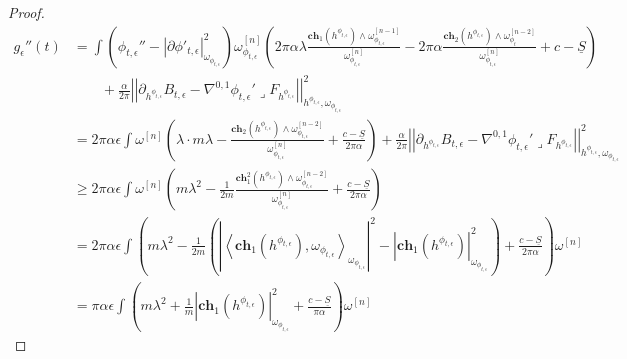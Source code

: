 \documentclass[10pt, letterpaper]{amsart}
\theoremstyle{plain}
\theoremstyle{definition}
\numberwithin{equation}{section}
\begin{document}
	\begin{proof}
		\begin{equation}
		\begin{split}
		g_\epsilon''(t)
		&
		= \int \left(\phi_{t,\epsilon}''-\left|\partial \phi'_{t,\epsilon}\right|_{\omega_{\phi_{t,\epsilon}}}^2\right)\omega_{\phi_{t,\epsilon}}^{[n]}  \left( 
		2\pi\alpha\lambda \frac{\mathbf{ch}_1\left(h^{\phi_{t,\epsilon}}\right)\wedge  \omega_{\phi_{t,\epsilon}}^{[n-1]}}{\omega_{\phi_{t,\epsilon}}^{[n]}}
		-
		2\pi \alpha \frac{\mathbf{ch}_2\left(h^{\phi_{t,\epsilon}}\right)\wedge\omega_{\phi_t}^{[n-2]}}{\omega_{\phi_{t,\epsilon}}^{[n]}}
	+c-\underline{S}
        \right)\\
		&\qquad
		+
		\frac{\alpha}{2\pi}\left|\left| \partial_{h^{\phi_{t,\epsilon}}} B_{t,\epsilon}-\nabla^{0,1}\phi_{t,\epsilon}'\lrcorner F_{h^{\phi_{t,\epsilon}}}\right|\right|_{h^{\phi_{t,\epsilon}},\omega_{\phi_{t,\epsilon}}}^2\\
		& 
		= 
		2\pi\alpha\epsilon \int  \omega^{[n]} 
		\left( 
		\lambda \cdot m\lambda 
		- 
		\frac{\mathbf{ch}_2\left(h^{\phi_{t,\epsilon}}\right)\wedge \omega_{\phi_{t,\epsilon}}^{[n-2]}}{\omega_{\phi_{t,\epsilon}}^{[n]}}
        +\frac{c-\underline{S}}{2\pi \alpha}
		\right)
		+
		\frac{\alpha}{2\pi}\left|\left| \partial_{h^{\phi_{t,\epsilon}}} B_{t,\epsilon}-\nabla^{0,1}\phi_{t,\epsilon}'\lrcorner F_{h^{\phi_{t,\epsilon}}}\right|\right|_{h^{\phi_{t,\epsilon}},\omega_{\phi_{t,\epsilon}}}^2\\
		&
		\geq 
		2\pi\alpha\epsilon \int \omega^{[n]} 
		\left(m\lambda^2 
		-
		\frac{1}{2m}\frac{\mathbf{ch}_1^2\left(h^{\phi_{t,\epsilon}}\right)\wedge \omega_{\phi_{t,\epsilon}}^{[n-2]}}{\omega_{\phi_{t,\epsilon}}^{[n]}}
 +\frac{c-\underline{S}}{2\pi \alpha}
        \right) \\
		& 
		= 
		2\pi\alpha\epsilon \int
		\left(m\lambda^2 
		-
		\frac{1}{2m}
		\left(
		\left| \left\langle \mathbf{ch}_1\left(h^{\phi_{t,\epsilon}}\right), \omega_{\phi_{t,\epsilon}}\right\rangle_{\omega_{\phi_{t,\epsilon}}}\right|^2 
		- 
		\left| \mathbf{ch}_1\left(h^{\phi_{t,\epsilon}}\right) \right|_{\omega_{\phi_{t,\epsilon}}}^2
		\right)
 +\frac{c-\underline{S}}{2\pi \alpha}
		\right) \omega^{[n]}        \\
		& 
		= 
		\pi\alpha\epsilon 
		\int \left( m\lambda^2 + \frac{1}{m}\left| \mathbf{ch}_1\left(h^{\phi_{t,\epsilon}}\right) \right|_{\omega_{\phi_{t,\epsilon}}}^2
         +\frac{c-\underline{S}}{\pi \alpha}
		\right)
		\omega^{[n]}
		\end{split}
		\end{equation}	

\end{proof}
\end{document}
